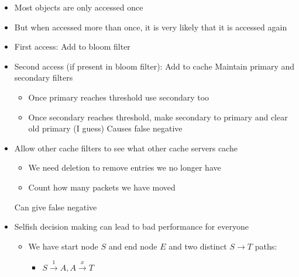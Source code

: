 \begin{itemize}
\begin{itemize}
\begin{itemize}
                    \item Most objects are only accessed once
                    \item But when accessed more than once, it is very likely that it is accessed again
                    \item First access: Add to bloom filter
                    \item Second access (if present in bloom filter): Add to cache
                     Maintain primary and secondary filters
                        \begin{itemize}
                            \item Once primary reaches threshold use secondary too
                            \item Once secondary reaches threshold, make secondary to primary and clear old primary (I guess)
                            \icon Causes false negative
                        \end{itemize}
                \end{itemize}
                \begin{itemize}
                    \item Allow other cache filters to see what other cache servers cache
                        \begin{itemize}
                            \item We need deletion to remove entries we no longer have
                            \item Count how many packets we have moved
                        \end{itemize}
                    \icon Can give false negative
                \end{itemize}
        \end{itemize}
        \begin{itemize}
            \item Selfish decision making can lead to bad performance for everyone
                \begin{itemize}
                    \item We have start node $S$ and end node $E$ and two distinct $S \to T$ paths:
                        \begin{itemize}
                            \item $S \overset{1}{\to} A, A \overset{x}{\to} T$

\end{itemize}
\end{itemize}
\end{itemize}
\end{itemize}
